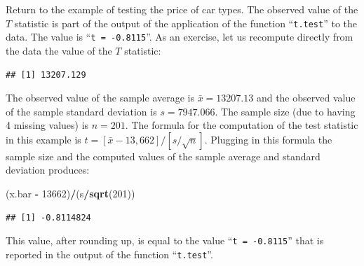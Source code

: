\documentclass[]{krantz}
\makeatletter
\newenvironment{Shaded}{\begin{snugshade}}{\end{snugshade}}
\newcommand{\DataTypeTok}[1]{\textcolor[rgb]{0.13,0.29,0.53}{#1}}
\newcommand{\DecValTok}[1]{\textcolor[rgb]{0.00,0.00,0.81}{#1}}
\newcommand{\KeywordTok}[1]{\textcolor[rgb]{0.13,0.29,0.53}{\textbf{#1}}}
\newcommand{\NormalTok}[1]{#1}
\newcommand{\OperatorTok}[1]{\textcolor[rgb]{0.81,0.36,0.00}{\textbf{#1}}}
\newcommand{\OtherTok}[1]{\textcolor[rgb]{0.56,0.35,0.01}{#1}}
\newcommand{\StringTok}[1]{\textcolor[rgb]{0.31,0.60,0.02}{#1}}
\newenvironment{kframe}{%
\medskip{}
\setlength{\fboxsep}{.8em}
 \def\at@end@of@kframe{}%
 \ifinner\ifhmode%
  \def\at@end@of@kframe{\end{minipage}}%
  \begin{minipage}{\columnwidth}%
 \fi\fi%
 \def\FrameCommand##1{\hskip\@totalleftmargin \hskip-\fboxsep
 \colorbox{shadecolor}{##1}\hskip-\fboxsep
     \hskip-\linewidth \hskip-\@totalleftmargin \hskip\columnwidth}%
 \MakeFramed {\advance\hsize-\width
   \@totalleftmargin\z@ \linewidth\hsize
   \@setminipage}}%
 {\par\unskip\endMakeFramed%
 \at@end@of@kframe}
\renewenvironment{Shaded}{\begin{kframe}}{\end{kframe}}
\theoremstyle{definition}
\theoremstyle{definition}
\theoremstyle{definition}
\theoremstyle{remark}
\makeatother
\begin{document}
Return to the example of testing the price of car types. The observed
value of the \(T\) statistic is part of the output of the application of
the function ``\texttt{t.test}'' to the data. The value is ``\texttt{t\ =\ -0.8115}''. As an
exercise, let us recompute directly from the data the value of the \(T\)
statistic:

\begin{Shaded}
\end{Shaded}

\begin{verbatim}
## [1] 13207.129
\end{verbatim}

\begin{Shaded}
\end{Shaded}

The observed value of the sample average is \(\bar x = 13207.13\) and the
observed value of the sample standard deviation is \(s = 7947.066\). The
sample size (due to having 4 missing values) is \(n=201\). The formula for
the computation of the test statistic in this example is
\(t = [\bar x - 13,662]/[s/\sqrt{n}]\). Plugging in this formula the
sample size and the computed values of the sample average and standard
deviation produces:

\begin{Shaded}
\begin{Highlighting}[]
\NormalTok{(x.bar }\OperatorTok{-}\StringTok{ }\DecValTok{13662}\NormalTok{)}\OperatorTok{/}\NormalTok{(s}\OperatorTok{/}\KeywordTok{sqrt}\NormalTok{(}\DecValTok{201}\NormalTok{))}
\end{Highlighting}
\end{Shaded}

\begin{verbatim}
## [1] -0.8114824
\end{verbatim}

This value, after rounding up, is equal to the value ``\texttt{t\ =\ -0.8115}''
that is reported in the output of the function ``\texttt{t.test}''.
\end{document}
